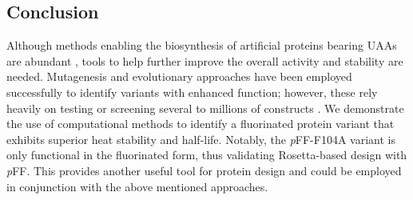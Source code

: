 \begin{refsection}
\section{Conclusion}

Although methods enabling the biosynthesis of artificial proteins bearing UAAs
are abundant \cite{Voloshchuk2009}, tools to help further improve the overall
activity and stability are needed. Mutagenesis and evolutionary approaches have
been employed successfully to identify variants with enhanced function;
however, these rely heavily on testing or screening several to millions of
constructs \cite{Voloshchuk2007b,Montclare2006b,Yoo2007}. We demonstrate the use
of computational methods to identify a fluorinated protein variant that
exhibits superior heat stability and half-life. Notably, the \emph{p}FF-F104A
variant is only functional in the fluorinated form, thus validating
Rosetta-based design with \emph{p}FF. This provides another useful tool for
protein design and could be employed in conjunction with the above mentioned
approaches.

\printbibliography[heading=subbibliography]

\end{refsection}
